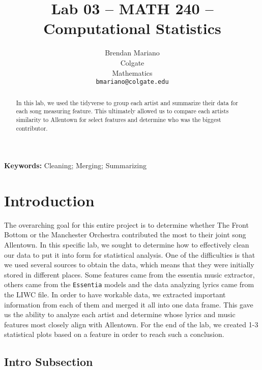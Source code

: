 \documentclass{article}\usepackage[]{graphicx}\usepackage[]{xcolor}
\begin{document}
\vspace{-1in}
\title{Lab 03 -- MATH 240 -- Computational Statistics}

\author{
  Brendan Mariano \\
  Colgate  \\
  Mathematics  \\
  {\tt bmariano@colgate.edu}
}

\date{}

\maketitle

\begin{multicols}{2}
\begin{abstract}
In this lab, we used the tidyverse to group each artist and summarize their data for each song measuring feature. This ultimately allowed us to compare each artists similarity to Allentown for select features and determine who was the biggest contributor. 
\end{abstract}

\noindent \textbf{Keywords:} Cleaning; Merging; Summarizing

\section{Introduction}
The overarching goal for this entire project is to determine whether The Front Bottom or the Manchester Orchestra contributed the most to their joint song Allentown. In this specific lab, we sought to determine how to effectively clean our data to put it into form for statistical analysis. One of the difficulties is that we used several sources to obtain the data, which means that they were initially stored in different places. Some features came from the essentia music extractor, others came from the \texttt{Essentia} models and the data analyzing lyrics came from the LIWC file. In order to have workable data, we extracted important information from each of them and merged it all into one data frame. This gave us the ability to analyze each artist and determine whose lyrics and music features most closely align with Allentown. For the end of the lab, we created 1-3 statistical plots based on a feature in order to reach such a conclusion.

\subsection{Intro Subsection}




\end{multicols}
\end{document}
